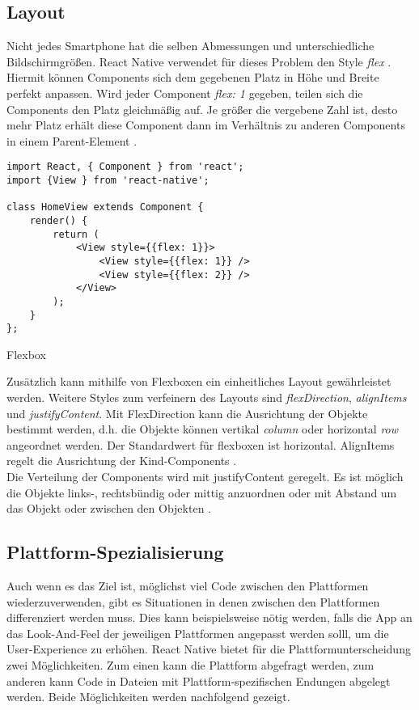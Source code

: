 \subsection{Layout}
Nicht jedes Smartphone hat die selben Abmessungen und unterschiedliche Bildschirmgrößen. React Native verwendet für dieses Problem den Style \textit{flex} \cite{facebook_inc._flex_2017}.  Hiermit können Components sich dem gegebenen Platz in Höhe und Breite perfekt anpassen. Wird jeder Component \textit{flex: 1} gegeben, teilen sich die Components den Platz gleichmäßig auf. Je größer die vergebene Zahl ist, desto mehr Platz erhält diese Component dann im Verhältnis zu anderen Components in einem Parent-Element \cite{facebook_inc._flex_2017}. 

\begin{listing}[H]
    \begin{verbatim}
import React, { Component } from 'react';
import {View } from 'react-native';

class HomeView extends Component {
    render() {
        return (
            <View style={{flex: 1}}>
                <View style={{flex: 1}} />
                <View style={{flex: 2}} />
            </View>
        );
    }
};

    \end{verbatim}
    \caption{Flexbox}
    \label{lst:flex}
\end{listing}

Zusätzlich kann mithilfe von Flexboxen ein einheitliches Layout gewährleistet werden. Weitere Styles zum verfeinern des Layouts sind \textit{flexDirection}, \textit{alignItems} und \textit{justifyContent}. Mit FlexDirection kann die Ausrichtung der Objekte bestimmt werden, d.h. die Objekte können vertikal \textit{column} oder horizontal \textit{row} angeordnet werden. Der Standardwert für flexboxen ist horizontal. AlignItems regelt die Ausrichtung der Kind-Components \cite{facebook_inc._flex_2017}. \\

Die Verteilung der Components wird mit justifyContent geregelt. Es ist möglich die Objekte links-, rechtsbündig oder mittig anzuordnen oder mit Abstand um das Objekt oder zwischen den Objekten \cite{facebook_inc._flex_2017}.

\subsection{Plattform-Spezialisierung}
Auch wenn es das Ziel ist, möglichst viel Code zwischen den Plattformen wiederzuverwenden, gibt es Situationen in denen zwischen den Plattformen differenziert werden muss. Dies kann beispielsweise nötig werden, falls die App an das Look-And-Feel der jeweiligen Plattformen angepasst werden solll, um die User-Experience zu erhöhen.
React Native bietet für die Plattformunterscheidung zwei Möglichkeiten. Zum einen kann die Plattform abgefragt werden, zum anderen kann Code in Dateien mit Plattform-spezifischen Endungen abgelegt werden. Beide Möglichkeiten werden nachfolgend gezeigt.

